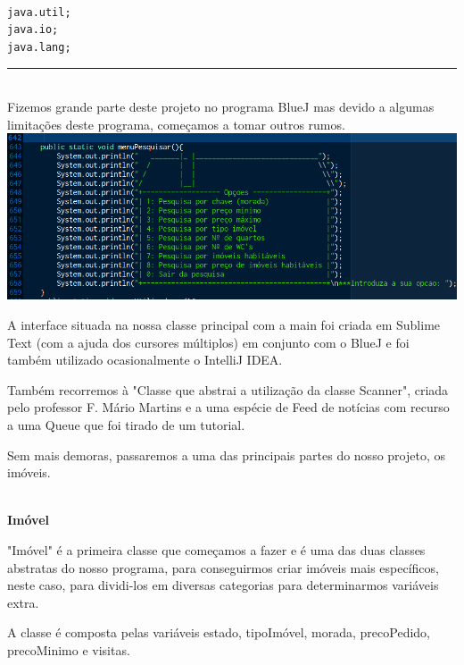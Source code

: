 \documentclass[12pt]{article}
\newenvironment{code}                    
{\textbf{
} \hspace{1cm} \hrulefill \\ 
\smallskip 
\begin{center}
\begin{minipage}{0.9\textwidth} 
\begin{alltt}\small}
{\end{alltt}
\end{minipage}
\end{center}
\hrule\smallskip
}
\begin{document}
\begin{code}
java.util;
java.io;
java.lang;

\end{code}
~\\

Fizemos grande parte deste projeto no programa BlueJ mas devido a algumas limitações deste programa, começamos a tomar outros rumos.
\newline
\newline
\includegraphics[scale=0.4]{002.png}	 
\newline
\newline

A interface situada na nossa classe principal com a main foi criada em Sublime Text (com a ajuda dos cursores múltiplos) em conjunto com o BlueJ e foi também utilizado ocasionalmente o IntelliJ IDEA.
\newline

Também recorremos à "Classe que abstrai a utilização da classe Scanner", criada pelo professor F. Mário Martins e a uma espécie de Feed de notícias com recurso a uma Queue que foi tirado de um tutorial.
\newline
\newline
\newline

Sem mais demoras, passaremos a uma das principais partes do nosso projeto, os imóveis.

\pagebreak

\textbf{\\Imóvel}
\newline

"Imóvel" é a primeira classe que começamos a fazer e é uma das duas classes abstratas do nosso programa, para conseguirmos criar imóveis mais específicos, neste caso, para dividi-los em diversas categorias para determinarmos variáveis extra. 
\newline

A classe é composta pelas variáveis estado, tipoImóvel, morada, precoPedido, precoMinimo e visitas. 
\newline
\end{document}
